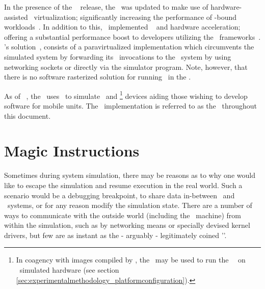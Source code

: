 In the presence of the \dvttermandroid\  release, the \dvttermandroidsdk\ was updated to make use of hardware-assisted \dvttermxeightysix\ virtualization; significantly increasing the performance of \dvttermcpu -bound workloads~.
In addition to this, \dvttermgoogle\ implemented \dvttermopengles\  and  hardware acceleration; offering a substantial performance boost to developers utilizing the \dvttermopengles\ frameworks~.
\dvttermgoogle 's solution~, consists of a paravirtualized implementation which circumvents the simulated system by forwarding its \dvttermopengles\ invocations to the \dvttermhost\ system by using networking sockets or directly via the simulator program.
Note, however, that there is no software rasterized solution for running \dvttermopenglestwopointo\ in the \dvttermandroidemulator .

As of \dvttermandroid\ , the \dvttermandroidemulator\ uses \dvttermqemu\ to simulate \dvttermarm\ and \dvttermxeightysix \footnote{In coagency with images compiled by \dvttermintel , the \dvttermandroidemulator\ may be used to run the \dvttermandroid\ \dvttermos\ on \dvttermxeightysix\ simulated hardware (see section \ref{sec:experimentalmethodology_platformconfiguration}).} devices aiding those wishing to develop software for mobile units.
The \dvttermandroidemulator\ implementation is referred to as the \dvttermreferencesolution\ throughout this document.

\section{Magic Instructions}
\label{sec:backgroundandrelatedwork_magicinstructions}
Sometimes during system simulation, there may be reasons as to why one would like to escape the simulation and resume execution in the real world.
Such a scenario would be a debugging breakpoint, to share data in-between \dvttermtarget\ and \dvttermhost\ systems, or for any reason modify the simulation state.
There are a number of ways to communicate with the outside world (including the \dvttermhost\ machine) from within the simulation, such as by networking means or specially devised kernel drivers, but few are as instant as the - arguably - legitimately coined '\dvttermmagicinstruction '.

